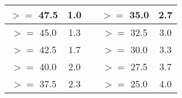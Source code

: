 \documentclass[a4paper,12pt]{report}
\begin{document}
\begin{center}
\begin{tabular}{ |c|c|c|c|c| } 
 \hline
 $>=$ 47.5 & 1.0 & & $>=$ 35.0 & 2.7 \\ \hline
 $>=$ 45.0 & 1.3 & & $>=$ 32.5 & 3.0  \\ \hline
 $>=$ 42.5 & 1.7 & & $>=$ 30.0 & 3.3   \\ \hline
 $>=$ 40.0 & 2.0 & & $>=$ 27.5 & 3.7  \\ \hline
 $>=$ 37.5 & 2.3 & & $>=$ 25.0 & 4.0  \\ \hline
\end{tabular}
\end{center}
\end{document}
